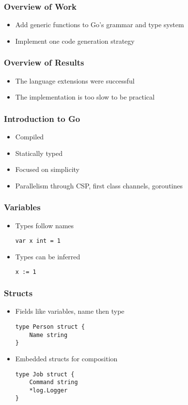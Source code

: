 \documentclass[12pt]{beamer}
\begin{document}
\begin{frame}
\frametitle{Overview of Work}
\begin{itemize}
\item Add generic functions to Go's grammar and type system
\item Implement one code generation strategy
\end{itemize}
\end{frame}


\begin{frame}
\frametitle{Overview of Results}
\begin{itemize}
\item The language extensions were successful
\item The implementation is too slow to be practical
\end{itemize}
\end{frame}


\begin{frame}
\frametitle{Introduction to Go}
\begin{itemize}
\item Compiled
\item Statically typed
\item Focused on simplicity
\item Parallelism through CSP, first class channels, goroutines
\end{itemize}
\end{frame}


\begin{frame}[fragile]
\frametitle{Variables}
\begin{itemize}
\item Types follow names
\begin{verbatim}
var x int = 1
\end{verbatim}
\item Types can be inferred
\begin{verbatim}
x := 1
\end{verbatim}
\end{itemize}
\end{frame}


\begin{frame}[fragile]
\frametitle{Structs}
\begin{itemize}
\item Fields like variables, name then type
\begin{verbatim}
type Person struct {
    Name string
}
\end{verbatim}
\item Embedded structs for composition
\begin{verbatim}
type Job struct {
    Command string
    *log.Logger
}
\end{verbatim}
\end{itemize}
\end{frame}
\end{document}
